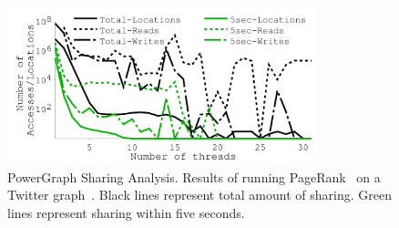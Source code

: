 {
\begin{figure}[th]
\begin{center}
\centerline{\includegraphics[width=0.8\textwidth]{hotpot/Figures/g_plot_pagerank_average.pdf}}
\caption[PowerGraph Sharing Analysis.]{PowerGraph Sharing Analysis.
Results of running PageRank~\cite{PageRank} on a Twitter graph~\cite{Kwak10-WWW}.
Black lines represent total amount of sharing.
Green lines represent sharing within five seconds.
}
\label{fig-pagerank}
\end{center}
\end{figure}
}